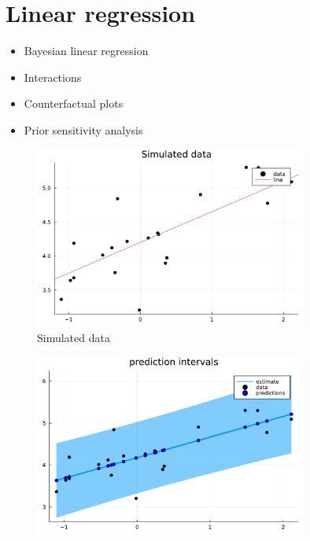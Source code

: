 \documentclass[aspectratio=169,xcolor=svgnames]{beamer}
\begin{document}
\section{Linear regression}

\begin{frame}
  \begin{itemize}
  \item Bayesian linear regression
  \item Interactions
  \item Counterfactual plots
  \item Prior sensitivity analysis
  \end{itemize}
\end{frame}

\begin{frame}
\begin{figure}[ht]
  \centering
  \includegraphics[width=0.8\textwidth]{figures/linear_data.pdf}
  \caption{\label{fig:label} Simulated data}
\end{figure}
\end{frame}

\begin{frame}
  \begin{figure}[ht]
    \centering
    \includegraphics[width=0.8\textwidth]{figures/linear_prediction_interval.pdf}
    \caption{\label{fig:label} }
  \end{figure}
\end{frame}
\end{document}
